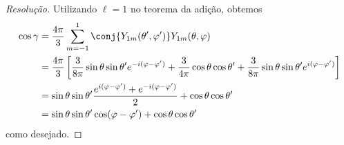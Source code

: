 \begin{proof}[Resolução]
    Utilizando \(\ell = 1\) no teorema da adição, obtemos
    \begin{align*}
        \cos \gamma &= \frac{4\pi}{3} \sum_{m = -1}^{1} \conj{Y_{1m}(\theta', \varphi')}Y_{1m}(\theta,\varphi)\\
                    &= \frac{4\pi}{3}\left[\frac{3}{8\pi} \sin\theta \sin\theta' e^{-i(\varphi-\varphi')} + \frac{3}{4\pi}\cos\theta \cos\theta' + \frac{3}{8\pi}\sin\theta \sin\theta' e^{i(\varphi - \varphi')}\right]\\
                    &= \sin\theta\sin\theta'\frac{e^{i(\varphi - \varphi')}+ e^{-i(\varphi - \varphi')}}{2} + \cos\theta \cos\theta'\\
                    &= \sin\theta\sin\theta' \cos(\varphi - \varphi') + \cos\theta \cos\theta'
    \end{align*}
    como desejado.


\end{proof}

